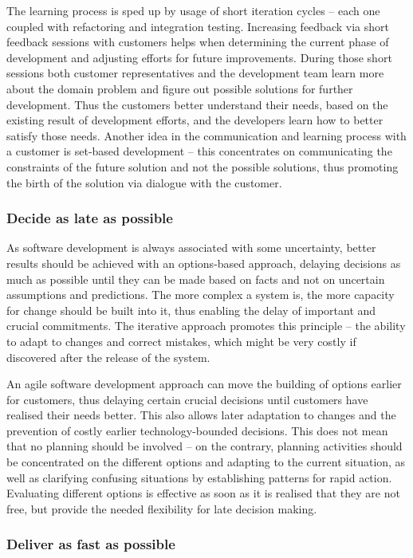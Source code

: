 The learning process is sped up by usage of short iteration cycles -- each one coupled with refactoring and integration testing. Increasing feedback via short feedback sessions with customers helps when determining the current phase of development and adjusting efforts for future improvements. During those short sessions both customer representatives and the development team learn more about the domain problem and figure out possible solutions for further development. Thus the customers better understand their needs, based on the existing result of development efforts, and the developers learn how to better satisfy those needs. Another idea in the communication and learning process with a customer is set-based development -- this concentrates on communicating the constraints of the future solution and not the possible solutions, thus promoting the birth of the solution via dialogue with the customer.

\subsubsection{Decide as late as possible}

As software development is always associated with some uncertainty, better results should be achieved with an options-based approach, delaying decisions as much as possible until they can be made based on facts and not on uncertain assumptions and predictions. The more complex a system is, the more capacity for change should be built into it, thus enabling the delay of important and crucial commitments. The iterative approach promotes this principle -- the ability to adapt to changes and correct mistakes, which might be very costly if discovered after the release of the system.

An agile software development approach can move the building of options earlier for customers, thus delaying certain crucial decisions until customers have realised their needs better. This also allows later adaptation to changes and the prevention of costly earlier technology-bounded decisions. This does not mean that no planning should be involved -- on the contrary, planning activities should be concentrated on the different options and adapting to the current situation, as well as clarifying confusing situations by establishing patterns for rapid action. Evaluating different options is effective as soon as it is realised that they are not free, but provide the needed flexibility for late decision making.

\subsubsection{Deliver as fast as possible}

